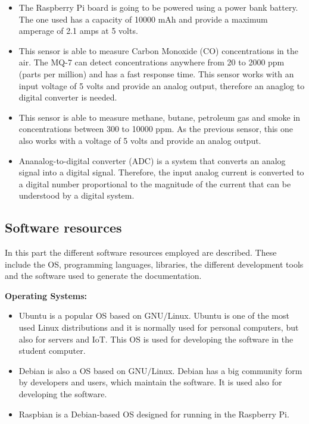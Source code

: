 \begin{itemize}
	\item {} The Raspberry Pi board is going to be powered using a power bank battery. The one used has a capacity of 10000 mAh and provide a maximum amperage of 2.1 amps at 5 volts.
	
	\item {} This sensor is able to measure Carbon Monoxide (CO) concentrations in the air. The MQ-7 can detect concentrations anywhere from 20 to 2000 ppm (parts per million) and has a fast response time. This sensor works with an input voltage of 5 volts and provide an analog output, therefore an anaglog to digital converter is needed.
	
	\item {} This sensor is able to measure methane, butane, petroleum gas and smoke in concentrations between 300 to 10000 ppm. As the previous sensor, this one also works with a voltage of 5 volts and provide an analog output.
	
	\item {} Ananalog-to-digital converter (ADC) is a system that converts an analog signal into a digital signal. Therefore, the input analog current is converted to a digital number proportional to the magnitude of the current that can be understood by a digital system.	
	
\end{itemize} 



\subsection{Software resources}
In this part the different software resources employed are described. These include the \ac{OS}, programming languages, libraries, the different development tools and the software used to generate the documentation.


\textbf{Operating Systems:}
\begin{itemize}
	\item {} Ubuntu is a popular \ac{OS} based on \ac{GNU}$/$Linux. Ubuntu is one of the most used Linux distributions and it is normally used for personal computers, but also for servers and \ac{IoT}. This \ac{OS} is used for developing the software in the student computer.
	
	\item {} Debian is also a \ac{OS} based on \ac{GNU}$/$Linux. Debian has a big community form by developers and users, which maintain the software. It is used also for developing the software.
	
	\item {} Raspbian is a Debian-based \ac{OS} designed for running in the Raspberry Pi.
	
	
\end{itemize}


